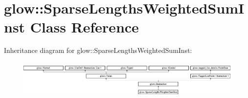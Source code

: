 \hypertarget{classglow_1_1_sparse_lengths_weighted_sum_inst}{}\section{glow\+:\+:Sparse\+Lengths\+Weighted\+Sum\+Inst Class Reference}
\label{classglow_1_1_sparse_lengths_weighted_sum_inst}
Inheritance diagram for glow\+:\+:Sparse\+Lengths\+Weighted\+Sum\+Inst\+:\begin{figure}[H]
\begin{center}
\leavevmode
\includegraphics[height=1.939394cm]{classglow_1_1_sparse_lengths_weighted_sum_inst}
\end{center}
\end{figure}
